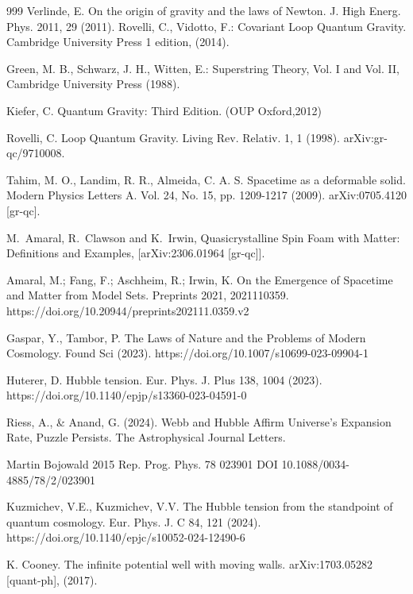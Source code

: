 \documentclass{article}
\begin{document}
\begin{thebibliography}{999}
%
    Verlinde, E. On the origin of gravity and the laws of Newton. J. High Energ. Phys. 2011, 29 (2011). 	
	Rovelli, C., Vidotto, F.:
	Covariant Loop Quantum Gravity.
	  Cambridge University Press  1 edition, (2014).

 	Green, M. B., Schwarz, J. H., Witten, E.: Superstring Theory, Vol. I and Vol. II, Cambridge University Press (1988).

    Kiefer, C. Quantum Gravity: Third Edition. (OUP Oxford,2012)
    
  Rovelli, C. Loop Quantum Gravity. Living Rev. Relativ. 1, 1 (1998). arXiv:gr-qc/9710008.

    Tahim, M. O., Landim, R. R., Almeida, C. A. S. Spacetime as a deformable solid. Modern Physics Letters A. Vol. 24, No. 15, pp. 1209-1217 (2009).
    arXiv:0705.4120 [gr-qc].
    
    M.~Amaral, R.~Clawson and K.~Irwin,
    Quasicrystalline Spin Foam with Matter: Definitions and Examples,
    [arXiv:2306.01964 [gr-qc]].

  Amaral, M.; Fang, F.; Aschheim, R.; Irwin, K. On the Emergence of Spacetime and Matter from Model Sets. Preprints 2021, 2021110359. https://doi.org/10.20944/preprints202111.0359.v2
  
    Gaspar, Y., Tambor, P. The Laws of Nature and the Problems of Modern Cosmology. Found Sci (2023). https://doi.org/10.1007/s10699-023-09904-1
        
    Huterer, D. Hubble tension. Eur. Phys. J. Plus 138, 1004 (2023). https://doi.org/10.1140/epjp/s13360-023-04591-0
        
    Riess, A., \& Anand, G. (2024). Webb and Hubble Affirm Universe’s Expansion Rate, Puzzle Persists. The Astrophysical Journal Letters.
    
     Martin Bojowald 2015 Rep. Prog. Phys. 78 023901
     DOI 10.1088/0034-4885/78/2/023901
    
     Kuzmichev, V.E., Kuzmichev, V.V. The Hubble tension from the standpoint of quantum cosmology. Eur. Phys. J. C 84, 121 (2024). https://doi.org/10.1140/epjc/s10052-024-12490-6
     
    K. Cooney. The infinite potential well with moving walls. arXiv:1703.05282 [quant-ph], (2017).
    

\end{thebibliography}
\end{document}
